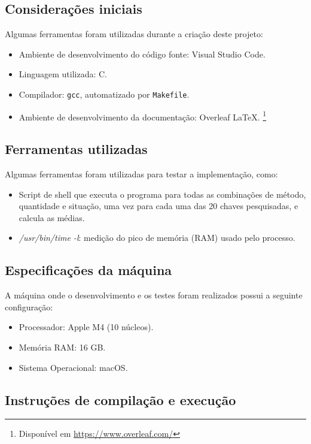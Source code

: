 \documentclass{article}
\begin{document}
\subsection{Considerações iniciais}

Algumas ferramentas foram utilizadas durante a criação deste projeto:

\begin{itemize}
  \item Ambiente de desenvolvimento do código fonte: Visual Studio Code.
  \item Linguagem utilizada: C.
  \item Compilador: \texttt{gcc}, automatizado por \texttt{Makefile}.
  \item Ambiente de desenvolvimento da documentação: Overleaf \LaTeX. \footnote{Disponível em \url{https://www.overleaf.com/}}
\end{itemize}

\subsection{Ferramentas utilizadas}
Algumas ferramentas foram utilizadas para testar a implementação, como:
\begin{itemize}
    \item[-] Script de shell que executa o programa para todas as combinações de método, quantidade e situação, uma vez para cada uma das 20 chaves pesquisadas, e calcula as médias.
    \item[-] \textit{/usr/bin/time -l}: medição do pico de memória (RAM) usado pelo processo.
\end{itemize}

\subsection{Especificações da máquina}
\label{sec:maquina}
A máquina onde o desenvolvimento e os testes foram realizados possui a seguinte configuração:
\begin{itemize}
    \item[-] Processador: Apple M4 (10 núcleos).
    \item[-] Memória RAM: 16 GB.
    \item[-] Sistema Operacional: macOS.
\end{itemize}

\subsection{Instruções de compilação e execução}
\end{document}
